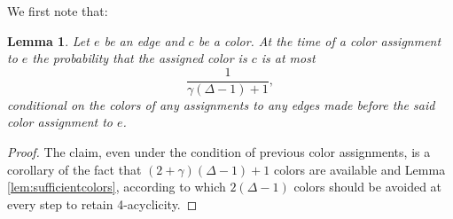 \documentclass{amsart}
\theoremstyle{plain}
\newtheorem{lemma}{Lemma}
\newcommand{\K}{(2+\gamma)(\Delta-1)+1}
\begin{document}
We first note that:


\begin{lemma}%
\label{lem:randomness}
Let $e$ be an edge and $c$ be a color.  {\em At the time of a color assignment to $e$} the probability that the assigned color is $c$ is at most $$\frac{1}{\gamma(\Delta - 1)+1},$$ conditional on the colors of any assignments to any edges made before the said color assignment to $e$.
\end{lemma}

\begin{proof} The claim, even under the condition of previous color assignments, is a corollary of the fact that $\K$ colors are available and Lemma \ref{lem:sufficientcolors}, according to which $2(\Delta-1)$ colors should be avoided at every step to retain 4-acyclicity.  
\end{proof}
\end{document}
